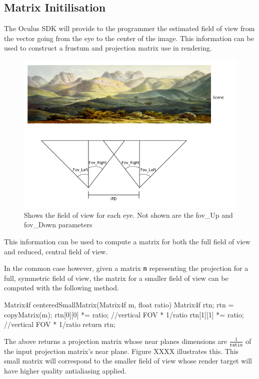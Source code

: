 \documentclass[12pt,a4paper,twoside,openright]{report}
\begin{document}
\subsection{Matrix Initilisation}

The Oculus SDK will provide to the programmer the estimated field of view from the vector going from the eye to the center of the image. This information can be used to construct a frustum and projection matrix use in rendering.

\begin{figure}[tbh]
\centerline{\includegraphics[scale=0.6]{figs/asymmetrical_fov.png}}
\caption{Shows the field of view for each eye. Not shown are the fov\_Up and fov\_Down parameters}
\label{epsfig1}
\end{figure}

This information can be used to compute a matrix for both the full field of view and reduced, central field of view.

In the common case however, given a matrix \texttt{m} representing the projection for a full, symmetric field of view, the matrix for a smaller field of view can be computed with the following method.

\begin{blockcode}
Matrix4f centeredSmallMatrix(Matrix4f m, float ratio){
    Matrix4f rtn; 
    rtn = copyMatrix(m);
    rtn[0][0] *= ratio; //vertical FOV * 1/ratio
    rtn[1][1] *= ratio; //vertical FOV * 1/ratio
    return rtn;
}
\end{blockcode}

The above returns a projection matrix whose near planes dimensions are $\frac{1}{\texttt{ratio}}$ of the input projection matrix's near plane. Figure XXXX illustrates this. This small matrix will correspond to the smaller field of view whose render target will have higher quality antialiasing applied. 
\end{document}
